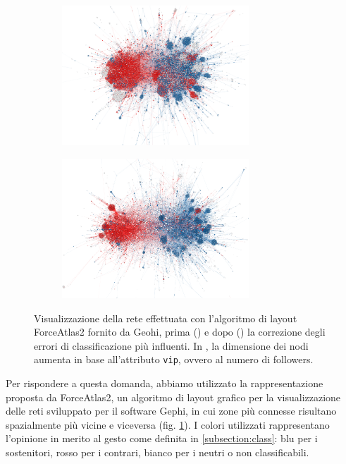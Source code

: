     \begin{figure}[pb]
        \centering
        \begin{subfigure}{.4\textwidth}
            \centering
            \caption{}
            \includegraphics[width=7cm]{7_Open_question/rete_vecchia_cut.png}
            \label{echo_chamber_not_clean}
        \end{subfigure}
        \centering
        \begin{subfigure}{.4\textwidth}
            \centering
            \caption{}
            \includegraphics[width=7cm]{7_Open_question/rete_nuova_cut.png}
            \label{echo_chamber_clean}
        \end{subfigure}
        \vspace{-5mm}
        \caption{Visualizzazione della rete effettuata con l'algoritmo di layout ForceAtlas2 fornito da Geohi, prima () e dopo () la correzione degli errori di classificazione più influenti. In , la dimensione dei nodi aumenta in base all'attributo \texttt{vip}, ovvero al numero di followers.}
        \label{echochambers}
    \end{figure}
    
    Per rispondere a questa domanda, abbiamo utilizzato la rappresentazione proposta da ForceAtlas2, un algoritmo di layout grafico per la visualizzazione delle reti sviluppato per il software Gephi, in cui zone più connesse risultano spazialmente più vicine e viceversa (fig. \ref{echo_chamber_not_clean}). 
    I colori utilizzati rappresentano l'opinione in merito al gesto come definita in \ref{subsection:class}: blu per i sostenitori, rosso per i contrari, bianco per i neutri o non classificabili. 
    
